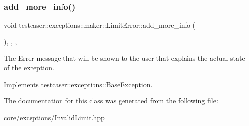\subsubsection{\texorpdfstring{add\_more\_info()}{add\_more\_info()}}
{\footnotesize\ttfamily void testcaser\+::exceptions\+::maker\+::\+Limit\+Error\+::add\+\_\+more\+\_\+info (\begin{DoxyParamCaption}{ }\end{DoxyParamCaption})\hspace{0.3cm}{\ttfamily [inline]}, {\ttfamily [final]}, {\ttfamily [override]}, {\ttfamily [virtual]}}



The Error message that will be shown to the user that explains the actual state of the exception. 



Implements \mbox{\hyperlink{classtestcaser_1_1exceptions_1_1BaseException_ad607ea04e2cb4ad9b8d0e2e6b6734f2f}{testcaser\+::exceptions\+::\+Base\+Exception}}.



The documentation for this class was generated from the following file\+:\begin{DoxyCompactItemize}
\item 
core/exceptions/Invalid\+Limit.\+hpp\end{DoxyCompactItemize}
